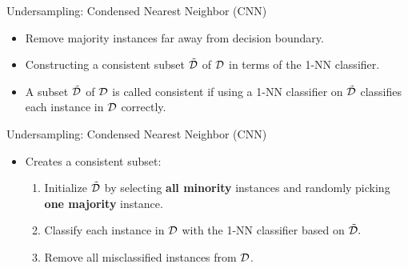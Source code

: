\documentclass[11pt,compress,t,notes=noshow, xcolor=table]{beamer}
\begin{document}
	
\begin{frame}{Undersampling: Condensed Nearest Neighbor (CNN)}
	
    \begin{itemize}
    
        \item Remove majority instances far away from decision boundary. 
        \item Constructing a consistent subset $\tilde{\mathcal{D}}$ of $\mathcal{D}$ in terms of the 1-NN classifier. 

        \item A subset $\tilde{\mathcal{D}}$ of $\mathcal{D}$ is called consistent if using a 1-NN classifier on $\tilde{\mathcal{D}}$ classifies each instance in $\mathcal{D}$ correctly.

    \end{itemize}	

\end{frame}

\begin{frame}{Undersampling: Condensed Nearest Neighbor (CNN)}
    \begin{itemize}
        \item Creates a consistent subset:
        
        \begin{enumerate}
    
            \item Initialize $\tilde{\mathcal{D}}$ by selecting \textbf{all minority} instances and randomly picking \textbf{one majority} instance.
    
            \item Classify each instance in $\mathcal{D}$ with the 1-NN classifier based on $\tilde{\mathcal{D}}.$
        
            \item Remove all misclassified instances from $\mathcal{D}$.
            
        \end{enumerate}	
    
    \end{itemize}
    
    
\end{frame}
	
\end{document}
